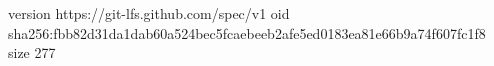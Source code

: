 version https://git-lfs.github.com/spec/v1
oid sha256:fbb82d31da1dab60a524bec5fcaebeeb2afe5ed0183ea81e66b9a74f607fc1f8
size 277
